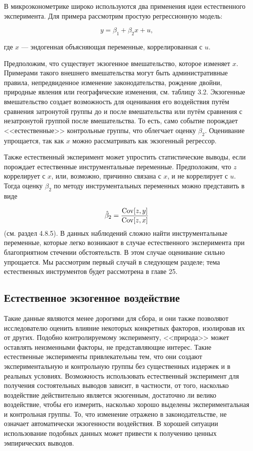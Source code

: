 В микроэконометрике широко используются два  применения идеи естественного эксперимента. Для примера рассмотрим простую регрессионную модель:

\begin{equation}
y=\beta_{1}+\beta_{2}x+u,
\end{equation}

где $x$ --- эндогенная объясняющая переменные, коррелированная с $u$.

Предположим, что существует экзогенное вмешательство, которое изменяет $x$. Примерами такого внешнего вмешательства могут быть административные правила, непредвиденное изменение законодательства, рождение двойни, природные явления или географические изменения, см. таблицу 3.2. Экзогенные вмешательство создает возможность для оценивания его воздействия путём сравнения  затронутой группы до и после вмешательства или путём сравнения с незатронутой группой после вмешательства. То есть, само событие порождает <<естественные>> контрольные группы, что облегчает оценку $\beta_{2}$. Оценивание упрощается, так как $x$ можно рассматривать как экзогенный регрессор.


Также естественный эксперимент может упростить статистические выводы, если порождает  естественные инструментальные переменные. Предположим, что $z$  коррелирует с $x$, или, возможно, причинно связана с $x$, и не коррелирует с $u$. Тогда оценку $\beta_{2}$ по методу инструментальных переменных можно представить в виде

\begin{equation}
\hat{\beta}_{2}=\frac{\mathrm{Cov}[z,y]}{\mathrm{Cov}[z,x]}
\end{equation}
(см. раздел 4.8.5). В  данных наблюдений сложно найти инструментальные переменные, которые легко возникают в случае естественного эксперимента при благоприятном стечении обстоятельств. В этом случае оценивание сильно упрощается. Мы рассмотрим первый случай в следующем разделе; тема естественных инструментов будет рассмотрена в главе 25.

\subsection{Естественное экзогенное воздействие}


Такие данные являются менее дорогими для сбора, и они также позволяют исследователю оценить влияние некоторых конкретных факторов, изолировав их от других. Подобно контролируемому эксперименту, <<природа>> может оставлять неизменными факторы, не представляющие интерес. Такие естественные эксперименты привлекательны тем, что они создают экспериментальную и контрольную группы без существенных издержек и в реальных условиях. Возможность использовать  естественный эксперимент для получения состоятельных выводов зависит, в частности, от того, насколько воздействие действительно является экзогенным, достаточно ли велико воздействие, чтобы его измерить, насколько хорошо выделены экспериментальная и контрольная группы. То, что изменение отражено в законодательстве, не означает автоматически экзогенности воздействия. В хорошей ситуации использование подобных данных может привести к получению ценных эмпирических выводов.


